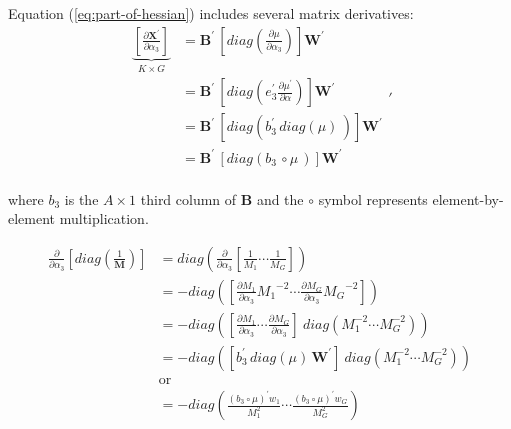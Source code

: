 \documentclass{article}
\begin{document}
Equation (\ref{eq:part-of-hessian}) includes several matrix derivatives:
\begin{equation}
\begin{aligned}
\underbrace{
\left[  \frac{\partial \boldsymbol{X}^\prime}{\partial \alpha_3}  \right]}_{K \times G} 
&= 
\boldsymbol{B}^\prime\,
\left[ diag
\left( 
  \frac{\partial \mu}{\partial \alpha_3}  
\right) 
\right] 
\boldsymbol{W}^\prime \\
&= 
\boldsymbol{B}^\prime\,
\left[ diag
\left(
e^\prime_3
  \frac{\partial \mu^\prime}{\partial \alpha} 
\right) 
\right] 
\boldsymbol{W}^\prime \\
&= 
\boldsymbol{B}^\prime\,
\left[ diag
\left(
b^\prime_3
\, diag (\mu) \,
\right) 
\right] 
\boldsymbol{W}^\prime \\
&= 
\boldsymbol{B}^\prime\,
\left[ diag
\left(
b_3 
\, \circ \mu \,
\right) 
\right] 
\boldsymbol{W}^\prime \\
\end{aligned}'
\label{eq:X-deriv}
\end{equation}

\noindent where $b_3$ is the $A \times 1$ third column of $\mathbf{B}$ and the $\circ$ symbol represents element-by-element multiplication.

\begin{equation}
\begin{aligned}
\frac{\partial}{\partial \alpha_3} \left[ diag(\frac{1}{\boldsymbol{M}}) \right]
&= 
diag \left( \frac{\partial}{\partial \alpha_3} \left[ \frac{1}{M_1} \cdots \frac{1}{M_G} \right] \right) \\
&= 
-diag \left( 
 \left[ 
 \frac{\partial M_1}{\partial \alpha_3}
 {M_1}^{-2} \cdots \frac{\partial M_G}{\partial \alpha_3}
 {M_G}^{-2} \right] \right) \\
&= 
-diag \left( 
 \left[ 
 \frac{\partial M_1}{\partial \alpha_3}
  \cdots \frac{\partial M_G}{\partial \alpha_3}
 \right] \: diag \left( M_1^{-2} \cdots M_G^{-2} \right) \right) \\
 &= 
-diag \left( 
 \left[ 
 b_3^\prime \, diag(\mu) \, \mathbf{W}^\prime  \right] \: diag \left( M_1^{-2} \cdots M_G^{-2} \right) \right) \\ 
& \text{or} \\
&= -diag \left(
\frac{(b_3 \circ \mu)^\prime  w_1}{M_1^2}
\cdots
\frac{(b_3 \circ \mu)^\prime  w_G}{M_G^2}
\right)
\end{aligned}    
\label{eq:Minverse-deriv}
\end{equation}
\end{document}
